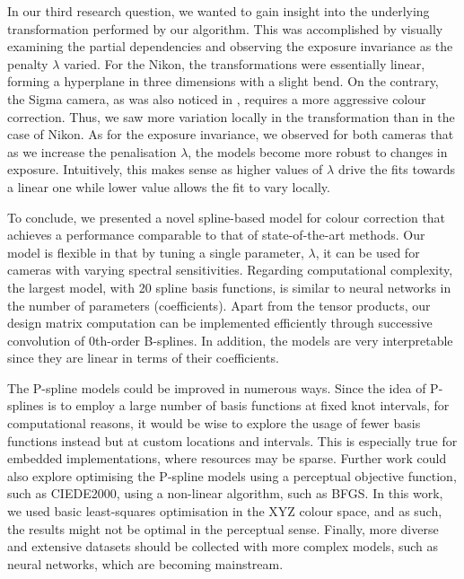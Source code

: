 In our third research question, we wanted to gain insight into the underlying transformation performed by our algorithm. This was accomplished by visually examining the partial dependencies and observing the exposure invariance as the penalty $\lambda$ varied. For the Nikon, the transformations were essentially linear, forming a hyperplane in three dimensions with a slight bend. On the contrary, the Sigma camera, as was also noticed in \cite{finlayson2015color}, requires a more aggressive colour correction. Thus, we saw more variation locally in the transformation than in the case of Nikon. As for the exposure invariance, we observed for both cameras that as we increase the penalisation $\lambda$, the models become more robust to changes in exposure. Intuitively, this makes sense as higher values of $\lambda$ drive the fits towards a linear one while lower value allows the fit to vary locally.

To conclude, we presented a novel spline-based model for colour correction that achieves a performance comparable to that of state-of-the-art methods. Our model is flexible in that by tuning a single parameter, $\lambda$, it can be used for cameras with varying spectral sensitivities. Regarding computational complexity, the largest model, with 20 spline basis functions, is similar to neural networks in the number of parameters (coefficients). Apart from the tensor products, our design matrix computation can be implemented efficiently through successive convolution of 0th-order B-splines. In addition, the models are very interpretable since they are linear in terms of their coefficients.

The P-spline models could be improved in numerous ways. Since the idea of P-splines is to employ a large number of basis functions at fixed knot intervals, for computational reasons, it would be wise to explore the usage of fewer basis functions instead but at custom locations and intervals. This is especially true for embedded implementations, where resources may be sparse. Further work could also explore optimising the P-spline models using a perceptual objective function, such as CIEDE2000, using a non-linear algorithm, such as BFGS. In this work, we used basic least-squares optimisation in the XYZ colour space, and as such, the results might not be optimal in the perceptual sense. Finally, more diverse and extensive datasets should be collected with more complex models, such as neural networks, which are becoming mainstream.